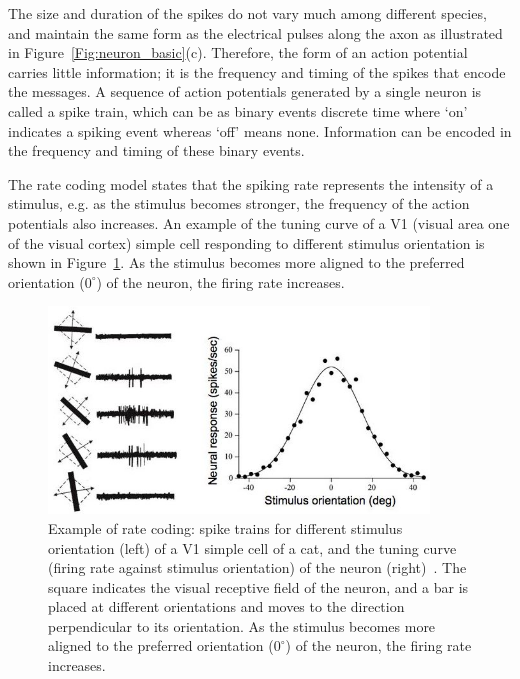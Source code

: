 The size and duration of the spikes do not vary much among different species, and maintain the same form as the electrical pulses \DIFdelbegin {}\DIFdelend \DIFaddbegin {}\DIFaddend along the axon as illustrated in Figure~\ref{Fig:neuron_basic}(c).
Therefore, the form of an action potential carries little information;
it is the frequency and timing of the spikes that encode the messages.
A sequence of action potentials generated by a single neuron is called a spike train, which can be \DIFdelbegin {}\DIFdelend \DIFaddbegin {}\DIFaddend as binary events \DIFdelbegin {}\DIFdelend \DIFaddbegin {}\DIFaddend discrete time where `on' indicates a spiking event \DIFaddbegin {}\DIFaddend whereas `off' means none.
Information can be encoded in the frequency and timing of these binary events.


The rate coding model states that the spiking rate represents the intensity of a stimulus, e.g. as the stimulus becomes stronger, the frequency of the action potentials also increases.
An example of the tuning curve of a V1 (visual area one of the visual cortex) simple cell responding to different stimulus orientation is shown in Figure~\ref{Fig:v1}.
As the stimulus becomes more aligned to the preferred orientation ($0^\circ$) of the neuron, the firing rate increases.

\begin{figure}[bt]
	\centering
	\includegraphics[width=0.9\textwidth]{pics_snn/v1.jpg}
	\caption{Example of rate coding: spike trains for different stimulus orientation (left) of a V1 simple cell of a cat, and the tuning curve (firing rate against stimulus orientation) of the neuron (right)~\citep{hubel1962receptive}.
	The square indicates the visual receptive field of the neuron, and a bar is placed at different orientations and moves to the direction perpendicular to its orientation.
    As the stimulus becomes more aligned to the preferred orientation ($0^\circ$) of the neuron, the firing rate increases.}
	\label{Fig:v1}
\end{figure}

